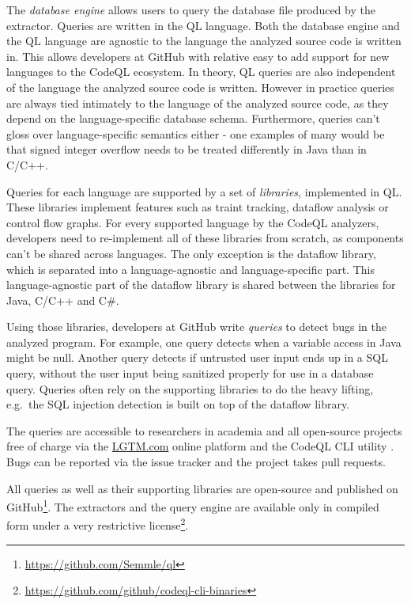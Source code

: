 The \emph{database engine} allows users to query the database file produced by the extractor.
Queries are written in the QL language.
Both the database engine and the QL language are agnostic to the language the analyzed source code 
is written in.
This allows developers at GitHub with relative easy to add support for new languages to the CodeQL ecosystem.
In theory, QL queries are also independent of the language the analyzed source code is written.
However in practice queries are always tied intimately to the language of the analyzed source code,
as they depend on the language-specific database schema.
Furthermore, queries can't gloss over language-specific semantics either - one examples of many would be
that signed integer overflow needs to be treated differently in Java than in C/C++.

Queries for each language are supported by a set of \emph{libraries}, implemented in QL.
These libraries implement features such as traint tracking, dataflow analysis or control flow graphs.
For every supported language by the CodeQL analyzers, developers need to re-implement all of these libraries from
scratch, as components can't be shared across languages.
The only exception is the dataflow library, which is separated into a language-agnostic and 
language-specific part.
This language-agnostic part of the dataflow library is shared between the libraries for Java, C/C++ and C\#.

Using those libraries, developers at GitHub  write \emph{queries} to detect bugs in the analyzed program.
For example, one query detects when a variable access in Java might be null.
Another query detects if untrusted user input ends up in a SQL query, without the user input being 
sanitized properly for use in a database query.
Queries often rely on the supporting libraries to do the heavy lifting, e.g.\ the SQL injection detection 
is built on top of the dataflow library.


The queries are accessible to researchers in academia and all open-source projects free of charge 
via the \href{https://LGTM.com}{LGTM.com} online platform and the CodeQL CLI utility . %
Bugs can be reported via the issue tracker and the project takes pull requests.


All queries as well as their supporting libraries are open-source and published 
on GitHub\footnote{\url{https://github.com/Semmle/ql}}.
The extractors and the query engine are available only in compiled form under a 
very restrictive license\footnote{\url{https://github.com/github/codeql-cli-binaries}}.


